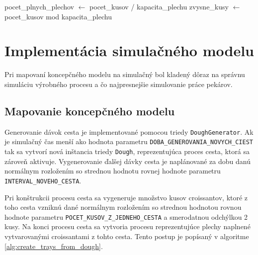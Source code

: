 \documentclass[11pt]{article}
\begin{document}
\begin{algorithm}[H]
\DontPrintSemicolon
\SetAlgoLined

\caption{Proces vytvárania plechov z cesta}
\label{alg:create_trays_from_dough}

pocet\_plnych\_plechov $\leftarrow$ pocet\_kusov / kapacita\_plechu\;
zvysne\_kusy $\leftarrow$ pocet\_kusov mod kapacita\_plechu\;


\end{algorithm}

\newpage
\section{Implementácia simulačného modelu}
Pri mapovaní koncepčného modelu na simulačný bol kladený dôraz na správnu simuláciu výrobného procesu a čo najpresnejšie simulovanie práce pekárov.

\subsection{Mapovanie koncepčného modelu}
Generovanie dávok cesta je implementované pomocou triedy \texttt{DoughGenerator}. Ak je simulačný čas menší ako hodnota parametru \texttt{DOBA\_GENEROVANIA\_NOVYCH\_CIEST} tak sa vytvorí nová inštancia triedy \texttt{Dough}, reprezentujúca proces cesta, ktorá sa zároveň aktivuje. Vygenerovanie ďalšej dávky cesta je naplánované za dobu danú normálnym rozložením so strednou hodnotu rovnej hodnote parametru \texttt{INTERVAL\_NOVEHO\_CESTA}.\newline

Pri konštrukcii procesu cesta sa vygeneruje množstvo kusov croissantov, ktoré z toho cesta vzniknú dané normálnym rozložením so strednou hodnotou rovnou hodnote parametru \texttt{POCET\_KUSOV\_Z\_JEDNEHO\_CESTA} a smerodatnou odchýlkou 2 kusy. Na konci procesu cesta sa vytvoria procesu reprezentujúce plechy naplnené vytvarovanými croissantami z tohto cesta.
Tento postup je popísaný v algoritme \ref{alg:create_trays_from_dough}.\newline
\end{document}
